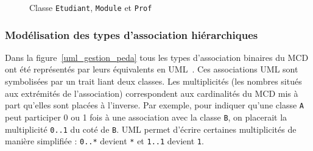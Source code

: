 \documentclass[a4paper,11pt]{article}
\begin{document}
\begin{figure}\centering
{}
\caption{Classe \texttt{Etudiant}, \texttt{Module} et \texttt{Prof}\label{classe_metier}}
\end{figure}

\subsubsection{Modélisation des types d'association hiérarchiques}
Dans la figure~\ref{uml_gestion_peda} tous les types d'association binaires du MCD ont été représentés 
par leurs équivalents en UML~\citep{book/Booch1999,book/Rumbaugh1998}. Ces associations UML sont symbolisées par un trait liant deux classes. 
Les multiplicités (les nombres situés aux extrémités de l'association) correspondent aux cardinalités 
du MCD mis à part qu'elles sont placées à l'inverse. Par exemple, pour indiquer qu'une classe \texttt{A}
peut participer 0 ou 1 fois à une association avec la classe \texttt{B}, on placerait la 
multiplicité \texttt{0..1} du coté de \texttt{B}. UML permet d'écrire certaines multiplicités de 
manière simplifiée : \texttt{0..*} devient \texttt{*} et \texttt{1..1} devient \texttt{1}.
\end{document}
